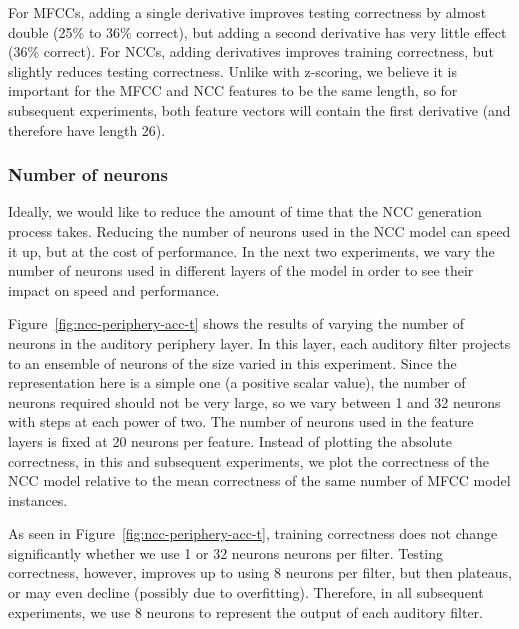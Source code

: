 For MFCCs, adding a single derivative
improves testing correctness
by almost double
(25\% to 36\% correct),
but adding a second derivative
has very little effect
(36\% correct).
For NCCs, adding derivatives
improves training correctness,
but slightly reduces testing correctness.
Unlike with z-scoring,
we believe it is important
for the MFCC and NCC features to
be the same length,
so for subsequent experiments,
both feature vectors
will contain the first derivative
(and therefore have length 26).

\subsubsection{Number of neurons}

Ideally,
we would like to reduce the amount of time
that the NCC generation process takes.
Reducing the number of neurons
used in the NCC model
can speed it up,
but at the cost of performance.
In the next two experiments,
we vary the number of neurons used
in different layers of the model
in order to see their impact
on speed and performance.


Figure~\ref{fig:ncc-periphery-acc-t} shows the results of
varying the number of neurons
in the auditory periphery layer.
In this layer,
each auditory filter projects
to an ensemble of neurons
of the size varied in this experiment.
Since the representation here
is a simple one
(a positive scalar value),
the number of neurons required
should not be very large,
so we vary between
1 and 32 neurons with steps
at each power of two.
The number of neurons used
in the feature layers
is fixed at 20 neurons per feature.
Instead of plotting the absolute correctness,
in this and subsequent experiments,
we plot the correctness of the NCC model
relative to the mean correctness
of the same number
of MFCC model instances.

As seen in Figure~\ref{fig:ncc-periphery-acc-t},
training correctness
does not change significantly
whether we use
1 or 32 neurons neurons per filter.
Testing correctness,
however, improves up to
using 8 neurons per filter,
but then plateaus,
or may even decline
(possibly due to overfitting).
Therefore, in all
subsequent experiments,
we use 8 neurons to represent
the output of each auditory filter.

